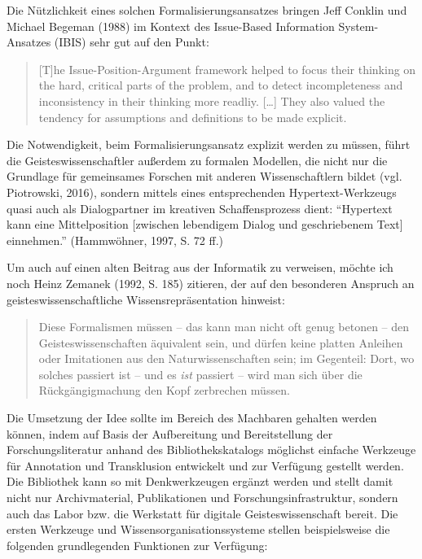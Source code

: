 \documentclass[a4paper,
fontsize=11pt,
oneside,
numbers=noperiodatend,
parskip=half-,
bibliography=totoc,
final
]{scrartcl}
\begin{document}
Die Nützlichkeit eines solchen Formalisierungsansatzes bringen Jeff
Conklin und Michael Begeman (1988) im Kontext des Issue-Based
Information System- Ansatzes (IBIS) sehr gut auf den Punkt:

\begin{quote}
{[}T{]}he Issue-Position-Argument framework helped to focus their
thinking on the hard, critical parts of the problem, and to detect
incompleteness and inconsistency in their thinking more readliy.
{[}\ldots{}{]} They also valued the tendency for assumptions and
definitions to be made explicit.
\end{quote}

Die Notwendigkeit, beim Formalisierungsansatz explizit werden zu müssen,
führt die Geisteswissenschaftler außerdem zu formalen Modellen, die
nicht nur die Grundlage für gemeinsames Forschen mit anderen
Wissenschaftlern bildet (vgl. Piotrowski, 2016), sondern mittels eines
entsprechenden Hypertext-Werk\-zeugs quasi auch als Dialogpartner im
kreativen Schaffensprozess dient: \enquote{Hypertext kann eine
Mittelposition {[}zwischen lebendigem Dialog und geschriebenem Text{]}
einnehmen.} (Hammwöhner, 1997, S. 72 ff.)

Um auch auf einen alten Beitrag aus der Informatik zu verweisen, möchte
ich noch Heinz Zemanek (1992, S. 185) zitieren, der auf den besonderen
Anspruch an geisteswissenschaftliche Wissensrepräsentation hinweist:

\begin{quote}
Diese Formalismen müssen -- das kann man nicht oft genug betonen -- den
Geisteswissenschaften äquivalent sein, und dürfen keine platten Anleihen
oder Imitationen aus den Naturwissenschaften sein; im Gegenteil: Dort,
wo solches passiert ist -- und es \emph{ist} passiert -- wird man sich
über die Rückgängigmachung den Kopf zerbrechen müssen.
\end{quote}

Die Umsetzung der Idee sollte im Bereich des Machbaren gehalten werden
können, indem auf Basis der Aufbereitung und Bereitstellung der
Forschungsliteratur anhand des Bibliothekskatalogs möglichst einfache
Werkzeuge für Annotation und Transklusion entwickelt und zur Verfügung
gestellt werden. Die Bibliothek kann so mit Denkwerkzeugen ergänzt
werden und stellt damit nicht nur Archivmaterial, Publikationen und
Forschungsinfrastruktur, sondern auch das Labor bzw. die Werkstatt für
digitale Geisteswissenschaft bereit. Die ersten Werkzeuge und
Wissensorganisationssysteme stellen beispielsweise die folgenden
grundlegenden Funktionen zur Verfügung:
\end{document}
